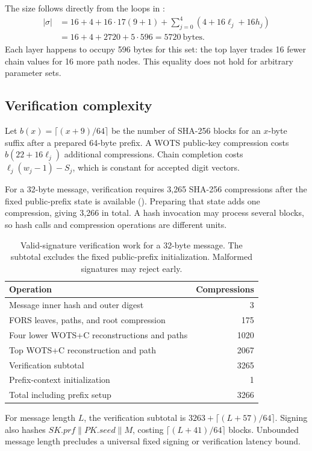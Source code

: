 \documentclass[a4paper,envcountsame,runningheads]{llncs}
\begin{document}
The size follows directly from the loops in :
\begin{align}\label{eq:size}
 |\sigma|&=16+4+16\cdot17(9+1)
      +\sum_{j=0}^{4}(4+16\ell_j+16h_j)\nonumber\\
 &=16+4+2720+5\cdot596=5720\ \mathrm{bytes}.
\end{align}
Each layer happens to occupy 596 bytes for this set: the top layer trades 16 fewer chain values for 16 more path nodes. This equality does not hold for arbitrary parameter sets.

\subsection{Verification complexity}
Let $b(x)=\lceil(x+9)/64\rceil$ be the number of SHA-256 blocks for an $x$-byte suffix after a prepared 64-byte prefix. A WOTS public-key compression costs $b(22+16\ell_j)$ additional compressions. Chain completion costs $\ell_j(w_j-1)-S_j$, which is constant for accepted digit vectors.

For a 32-byte message, verification requires 3,265 SHA-256 compressions after the fixed public-prefix state is available (). Preparing that state adds one compression, giving 3,266 in total. A hash invocation may process several blocks, so hash calls and compression operations are different units.

\begin{table}[t]
\caption{Valid-signature verification work for a 32-byte message. The subtotal excludes the fixed public-prefix initialization. Malformed signatures may reject early.}\label{tab:work}
\centering\small
\begin{tabular}{P{61mm}r}\toprule
Operation & Compressions\\\midrule
Message inner hash and outer digest &3\\
FORS leaves, paths, and root compression &175\\
Four lower WOTS+C reconstructions and paths &1020\\
Top WOTS+C reconstruction and path &2067\\\midrule
Verification subtotal &3265\\
Prefix-context initialization &1\\\midrule
Total including prefix setup &3266\\\bottomrule
\end{tabular}
\end{table}

For message length $L$, the verification subtotal is $3263+\lceil(L+57)/64\rceil$. Signing also hashes $SK.prf\|PK.seed\|M$, costing $\lceil(L+41)/64\rceil$ blocks. Unbounded message length precludes a universal fixed signing or verification latency bound.
\end{document}
